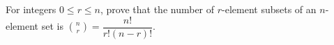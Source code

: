 For integers $0\le r\le n$, prove that the number of $r$-element subsets of an $n$-element set is $\binom nr=\dfrac{n!}{r!(n-r)!}$.
